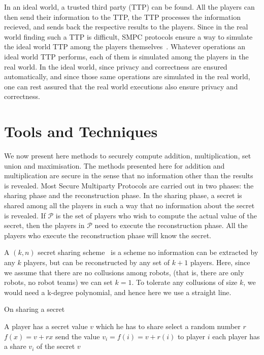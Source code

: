 In an ideal world, a trusted third party (TTP) can be found. All the players can then
send their information to the TTP, the TTP processes the information recieved, and sends back the 
respective results to the players. Since in the real world finding such a TTP is difficult, SMPC protocols 
ensure a way to simulate the ideal world TTP among the players themselves~\cite{GMW87:HtPaMG}. Whatever operations 
an ideal world TTP performs, each of them is simulated among the players in the real world. In the 
ideal world, since privacy and correctness are ensured automatically, and since those same operations
are simulated in the real world, one can rest assured that the real world executions also ensure
privacy and correctness.

\section{Tools and Techniques}
\label{sec:tt}

We now present here methods to securely compute addition, multiplication, set union
and maximisation. The methods presented here for addition and multiplication
are secure in the sense that no information other than the results is revealed. Most 
Secure Multiparty Protocols are carried out in two phases: the sharing phase and the 
reconstruction phase. In the sharing phase, a secret is shared among all the players in such
a way that no information about the secret is revealed. If $\mathcal{P}$ is the set of players
who wish to compute the actual value of the secret, then the players in $\mathcal{P}$
need to execute the reconstruction phase. All the players who execute the reconstruction 
phase will know the secret. 

A $(k,n)$ secret sharing scheme~\cite{S79:HtSaS} is a scheme no information can be extracted by any $k$ players,
but can be reconstructed by any set of $k+1$ players. Here, since we assume that there are no 
collusions among robots, (that is, there are only robots, no robot teams) we can set $k = 1$. 
To tolerate any collusions of size $k$, we would need a k-degree polynomial, and hence here we 
use a straight line.


\begin{algorithm}
\caption{On sharing a secret}
\label{algshare}
\begin{algorithmic}
\REQUIRE A player has a secret value $v$ which he has to share
\STATE select a random number $r$
\STATE $f(x) = v + rx$
	\STATE send the value $v_{i}= f(i) = v + r(i)$ to player $i$
\ENDFOR
\ENSURE each player has a share $v_{i}$ of the secret $v$
\end{algorithmic}
\end{algorithm}

